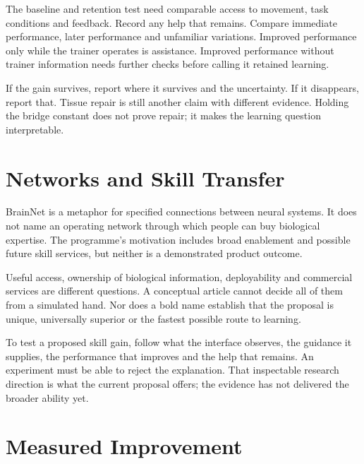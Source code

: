 The baseline and retention test need comparable access to movement, task conditions and feedback. Record any help that remains. Compare immediate performance, later performance and unfamiliar variations. Improved performance only while the trainer operates is assistance. Improved performance without trainer information needs further checks before calling it retained learning.\par

If the gain survives, report where it survives and the uncertainty. If it disappears, report that. Tissue repair is still another claim with different evidence. Holding the bridge constant does not prove repair; it makes the learning question interpretable.\par

\section{Networks and Skill Transfer}

BrainNet is a metaphor for specified connections between neural systems. It does not name an operating network through which people can buy biological expertise. The programme's motivation includes broad enablement and possible future skill services, but neither is a demonstrated product outcome.\par

Useful access, ownership of biological information, deployability and commercial services are different questions. A conceptual article cannot decide all of them from a simulated hand. Nor does a bold name establish that the proposal is unique, universally superior or the fastest possible route to learning.\par

To test a proposed skill gain, follow what the interface observes, the guidance it supplies, the performance that improves and the help that remains. An experiment must be able to reject the explanation. That inspectable research direction is what the current proposal offers; the evidence has not delivered the broader ability yet.\par






\section{Measured Improvement}

